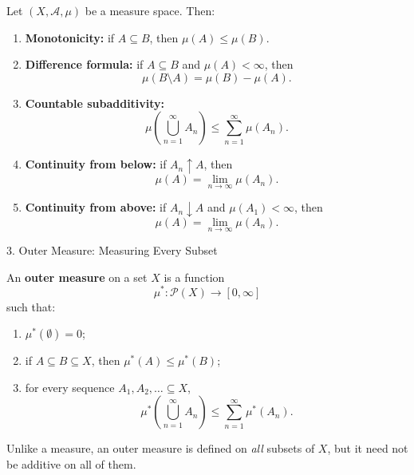 \documentclass[12pt,a4paper]{article}
\begin{document}
\begin{theorem}
    Let $(X,\mathcal{A},\mu)$ be a measure space. Then:
    \begin{enumerate}
        \item \textbf{Monotonicity:} if $A\subseteq B$, then $\mu(A)\leq\mu(B)$.
        \item \textbf{Difference formula:} if $A\subseteq B$ and $\mu(A)<\infty$, then
        \[
            \mu(B\setminus A)=\mu(B)-\mu(A).
        \]
        \item \textbf{Countable subadditivity:}
        \[
            \mu\!\left(\bigcup_{n=1}^{\infty}A_n\right)
            \leq\sum_{n=1}^{\infty}\mu(A_n).
        \]
        \item \textbf{Continuity from below:} if $A_n\uparrow A$, then
        \[
            \mu(A)=\lim_{n\to\infty}\mu(A_n).
        \]
        \item \textbf{Continuity from above:} if $A_n\downarrow A$ and $\mu(A_1)<\infty$, then
        \[
            \mu(A)=\lim_{n\to\infty}\mu(A_n).
        \]
    \end{enumerate}
\end{theorem}

\clearpage

\begin{heading}
    3. Outer Measure: Measuring Every Subset
\end{heading}

\vspace{10pt}

\begin{definition}
    An \textbf{outer measure} on a set $X$ is a function
    \[
        \mu^*:\mathcal{P}(X)\longrightarrow[0,\infty]
    \]
    such that:
    \begin{enumerate}
        \item $\mu^*(\emptyset)=0$;
        \item if $A\subseteq B\subseteq X$, then $\mu^*(A)\leq\mu^*(B)$;
        \item for every sequence $A_1,A_2,\ldots\subseteq X$,
        \[
            \mu^*\!\left(\bigcup_{n=1}^{\infty}A_n\right)
            \leq\sum_{n=1}^{\infty}\mu^*(A_n).
        \]
    \end{enumerate}
    Unlike a measure, an outer measure is defined on \emph{all} subsets of $X$, but it need not be additive on all of them.
\end{definition}
\end{document}
